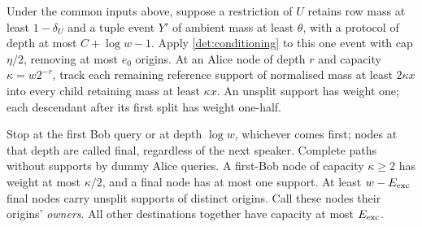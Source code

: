 \documentclass[11pt]{article} \usepackage[utf8]{inputenc}
\theoremstyle{plain} \newtheorem{theorem}{Theorem}[section]
\theoremstyle{definition} \newaliascnt{definition}{theorem}
\begin{document}
\begin{lemma}\label{res:destinations}
Under the common inputs above, suppose a restriction of $U$ retains row
mass at least $1-\delta_U$ and a tuple event $Y'$ of ambient mass at least
$\theta$, with a protocol of depth at most $C+\log w-1$.
Apply \cref{det:conditioning} to this one event with cap $\eta/2$, removing
at most $e_0$ origins. At an Alice node of depth $r$ and capacity
$\kappa=w2^{-r}$, track each remaining reference support of normalised
mass at least $2\kappa x$ into every child retaining mass at least
$\kappa x$. An unsplit support has weight one; each descendant after its
first split has weight one-half.

Stop at the first Bob query or at depth $\log w$, whichever comes first;
nodes at that depth are called final, regardless of the next speaker.
Complete paths without supports by dummy Alice queries. A first-Bob node
of capacity $\kappa\ge2$ has weight at most $\kappa/2$, and a final node
has at most one support. At least $w-E_{\rm exc}$ final nodes carry
unsplit supports of distinct origins. Call these nodes their origins'
\emph{owners}. All other destinations together have capacity at most
$E_{\rm exc}$.
\end{lemma}
\end{document}
